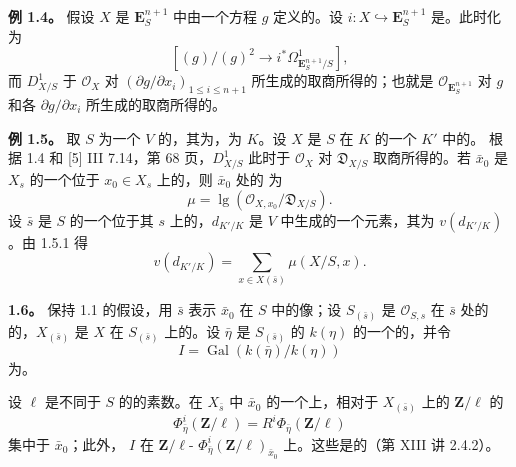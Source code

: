 \textbf{例 1.4。} 假设 $X$ 是 $\mathbf E^{n+1}_S$ 中由一个方程 $g$ 定义的。设 $i:X\hookrightarrow\mathbf E^{n+1}_S$ 是。此时化为
\[
[(g)/(g)^2\longrightarrow i^*\Omega^1_{\mathbf E^{n+1}_S/S}],
\]
而 $D^1_{X/S}$ 于 $\mathscr O_X$ 对 $(\partial g/\partial x_i)_{1\leq i\leq n+1}$ 所生成的取商所得的；也就是 $\mathscr O_{\mathbf E^{n+1}_S}$ 对 $g$ 和各 $\partial g/\partial x_i$ 所生成的取商所得的。

\textbf{例 1.5。} 取 $S$ 为一个 $V$ 的，其为，为 $K$。设 $X$ 是 $S$ 在 $K$ 的一个 $K'$ 中的。
根据 1.4 和 [5] III 7.14，第 68 页，$D^1_{X/S}$ 此时于 $\mathscr O_X$ 对 $\mathfrak D_{X/S}$ 取商所得的。若 $\bar x_0$ 是 $X_s$ 的一个位于 $x_0\in X_s$ 上的，则 $\bar x_0$ 处的 为
\[
\mu=\operatorname{lg}(\mathscr O_{X,x_0}/\mathfrak D_{X/S}).
\tag{1.5.1}
\]
设 $\bar s$ 是 $S$ 的一个位于其 $s$ 上的，$d_{K'/K}$ 是 $V$ 中生成的一个元素，其为 $v(d_{K'/K})$。由 1.5.1 得
\[
v(d_{K'/K})=\sum_{x\in X(\bar s)}\mu(X/S,x).
\tag{1.5.2}
\]

\textbf{1.6。} 保持 1.1 的假设，用 $\bar s$ 表示 $\bar x_0$ 在 $S$ 中的像；设 $S_{(\bar s)}$ 是 $\mathscr O_{S,s}$ 在 $\bar s$ 处的的，$X_{(\bar s)}$ 是 $X$ 在 $S_{(\bar s)}$ 上的。设 $\bar\eta$ 是 $S_{(\bar s)}$ 的 $k(\eta)$ 的一个的，并令
\[
I=\operatorname{Gal}(k(\bar\eta)/k(\eta))
\]
为。

设 $\ell$ 是不同于 $S$ 的的素数。在 $X_{\bar s}$ 中 $\bar x_0$ 的一个上，相对于 $X_{(\bar s)}$ 上的 $\mathbf Z/\ell$ 的
\[
\Phi^i_{\bar\eta}(\mathbf Z/\ell)=R^i\Phi_{\bar\eta}(\mathbf Z/\ell)
\]
集中于 $\bar x_0$；此外， $I$ 在 $\mathbf Z/\ell$- $\Phi^i_{\bar\eta}(\mathbf Z/\ell)_{\bar x_0}$ 上。这些是的（第 XIII 讲 2.4.2）。

